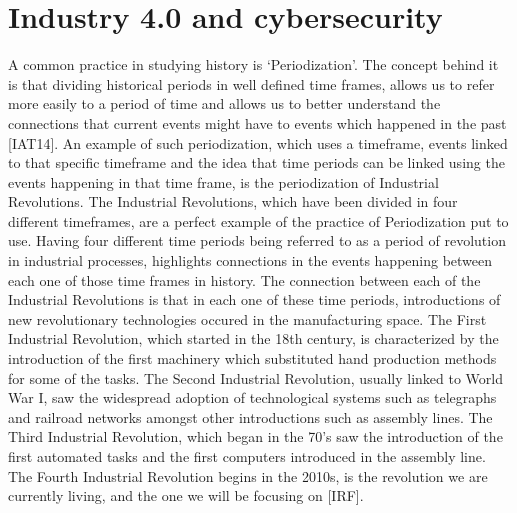 \documentclass[a4paper, 12pt]{book}
\begin{document}
\chapter{Industry 4.0 and cybersecurity}
A common practice in studying history is ‘Periodization’. The concept behind it is that dividing historical periods in well defined time frames, allows us to refer more easily to a period of time and allows us to better understand the connections that current events might have to events which happened in the past [IAT14]. An example of such periodization, which uses a timeframe, events linked to that specific timeframe and the idea that time periods can be linked using the events happening in that time frame, is the periodization of Industrial Revolutions.
The Industrial Revolutions, which have been divided in four different timeframes, are a  perfect example of the practice of Periodization put to use. Having four different time periods being referred to as a period of revolution in industrial processes, highlights connections in the events happening between each one of those time frames in history.
The connection between each of the Industrial Revolutions is that in each one of these time periods, introductions of new revolutionary technologies occured in the manufacturing space. The First Industrial Revolution, which started in the 18th century, is characterized by the introduction of the first machinery which substituted hand production methods for some of the tasks. The Second Industrial Revolution, usually linked to World War I, saw the widespread adoption of technological systems such as telegraphs and railroad networks amongst other introductions such as assembly lines. The Third Industrial Revolution, which began in the 70’s saw the introduction of the first automated tasks and the first computers introduced in the assembly line. The Fourth Industrial Revolution begins in the 2010s, is the revolution we are currently living, and the one we will be focusing on [IRF].
\end{document}

